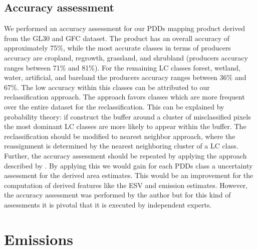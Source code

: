		\subsection{Accuracy assessment}
		\label{subsec:discussion_accuracy_assessment}
			We performed an accuracy assessment for our \acp{PDD} mapping product derived from the \ac{GL30} and \ac{GFC} dataset. The product has an overall accuracy of approximately 75\%, while the most accurate classes in terms of producers accuracy are cropland, regrowth, grassland, and shrubland (producers accuracy ranges between 71\% and 81\%). For the remaining \ac{LC} classes forest, wetland, water, artificial, and bareland the producers accuracy ranges between 36\% and 67\%. The low accuracy within this classes can be attributed to our reclassification approach. The approach favors classes which are more frequent over the entire dataset for the reclassification. This can be explained by probability theory: if construct the buffer around a cluster of misclassified pixels the most dominant \ac{LC} classes are more likely to appear within the buffer. The reclassification should be modified to nearest neighbor approach, where the reassignment is determined by the nearest neighboring cluster of a \ac{LC} class. Further, the accuracy assessment should be repeated by applying the approach described by \citet{Olofsson2014}. By applying this we would gain for each \acp{PDD} class a uncertainty assessment for the derived area estimates. This would be an improvement for the computation of derived features like the \ac{ESV} and emission estimates. However, the accuracy assessment was performed by the author but for this kind of assessments it is pivotal that it is executed by independent experts.

	\section{Emissions}

